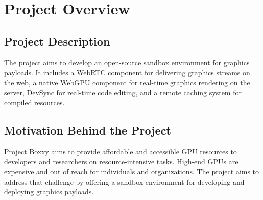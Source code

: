 
\chapter{Project Overview} %

\label{Chapter1} %



\section{Project Description}

The project aims to develop an open-source sandbox environment for graphics payloads. It includes a WebRTC component for delivering graphics streams on the web, a native WebGPU component for real-time graphics rendering on the server, DevSync for real-time code editing, and a remote caching system for compiled resources.

\section{Motivation Behind the Project}

Project Boxxy aims to provide affordable and accessible GPU resources to developers and researchers on resource-intensive tasks. High-end GPUs are expensive and out of reach for individuals and organizations. The project aims to address that challenge by offering a sandbox environment for developing and deploying graphics payloads.